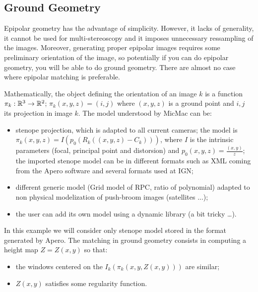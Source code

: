 
\subsection{Ground Geometry}

\label{Ground:Geom}

Epipolar geometry has the advantage of simplicity.  However, it lacks
of generality, it cannot be used for multi-stereoscopy and it imposes
unnecessary ressampling of the images. Moreover, generating proper epipolar
images requires some preliminary orientation of the image, so potentially
if you can do epipolar geometry, you will be able to do ground geometry. There
are almost no case where epipolar matching is preferable.

Mathematically, the object defining the orientation of an image $k$ is
a function  $\pi_k: \RR^3 \rightarrow \RR^2$; $\pi_k(x,y,z)=(i,j)$
where $(x,y,z)$ is a ground point and $i,j$ its projection in image
$k$.  The model understood by MicMac can be:


\begin{itemize}
   \item  stenope projection, which is adapted to all current cameras;
         the model is $\pi_k(x,y,z) = I (p_0 (R_k((x,y,z)-C_k)))$,
         where $I$ is the intrinsic parameters (focal, principal point and
         distorsion) and $p_0(x,y,z)=\frac{(x,y)}z$;
         the imported stenope model can be in different formats such as 
         XML coming from the Apero software and several formats used at IGN;

   \item  different generic model (Grid model of RPC, ratio of polynomial) 
          adapted to non physical modelization of push-broom images (satellites ...);

   \item the user can add its own model using a dynamic library (a bit tricky \dots).

\end{itemize}


In this example we will consider only stenope model stored in the format
generated by Apero. The matching in ground geometry consists in computing a
height map $Z=Z(x,y)$ so that:


\begin{itemize}
   \item   the windows centered on the $I_k(\pi_k(x,y,Z(x,y)))$  are similar;
   \item   $Z(x,y)$ satisfies some regularity function.
\end{itemize}

